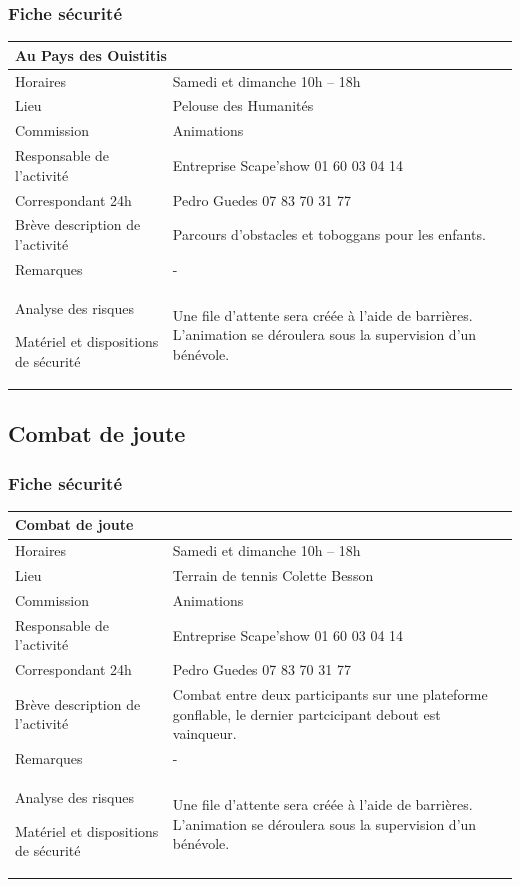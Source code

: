 \documentclass[hidelinks, paper=a4, fontsize=13pt]{report}
\begin{document}
\subsubsection{Fiche sécurité}
\begin{center}
\begin{tabular}{ | p{6cm} | p{10cm} | }
\hline
	\multicolumn{2}{|l|}{Au Pays des Ouistitis}  \\ \hline
	Horaires & Samedi et dimanche 10h – 18h \\ \hline
	Lieu & Pelouse des Humanités\\ \hline
	Commission & Animations \\ \hline
	Responsable de l'activité & Entreprise Scape'show 01 60 03 04 14 \\ \hline
	Correspondant 24h & Pedro Guedes 07 83 70 31 77 \\ \hline
	Brève description de l'activité & Parcours d'obstacles et toboggans pour les enfants. \\ \hline
	Remarques & - \\ \hline
	Analyse des risques
	
Matériel et dispositions de sécurité & Une file d’attente sera créée à l’aide de barrières. L'animation se déroulera sous la supervision d'un bénévole. \\ \hline
\end{tabular}

\end{center}

\subsection{Combat de joute}

\subsubsection{Fiche sécurité}
\begin{center}
\begin{tabular}{ | p{6cm} | p{10cm} | }
\hline
	\multicolumn{2}{|l|}{Combat de joute}  \\ \hline
	Horaires & Samedi et dimanche 10h – 18h \\ \hline
	Lieu & Terrain de tennis Colette Besson\\ \hline
	Commission & Animations \\ \hline
	Responsable de l'activité & Entreprise Scape'show 01 60 03 04 14 \\ \hline
	Correspondant 24h & Pedro Guedes 07 83 70 31 77 \\ \hline
	Brève description de l'activité & Combat entre deux participants sur une plateforme gonflable, le dernier partcicipant debout est vainqueur. \\ \hline
	Remarques & - \\ \hline
	Analyse des risques
	
Matériel et dispositions de sécurité & Une file d’attente sera créée à l’aide de barrières. L'animation se déroulera sous la supervision d'un bénévole. \\ \hline
\end{tabular}

\end{center}
\end{document}
